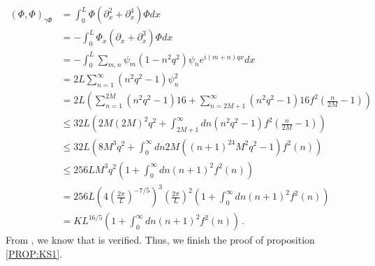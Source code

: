 \begin{align*}
  (\Phi, \Phi)_{\gamma \Phi} 
  & = \int_{0}^L \Phi(\partial^2_{x} + \partial^4_x) \Phi dx\\ 
  & = -\int_0^L \Phi_x(\partial_x + \partial^3_x) \Phi dx \\
  & = - \int_0^L \sum_{m, n} \psi_m (1 - n^2q^2) \psi_n e^{i(m+n)qx} dx \\
  & = 2L \sum_{n=1}^\infty(n^2q^2-1)\psi_n^2 \\
  & = 2L \left(\sum_{n=1}^{2M}(n^2q^2-1)16 +
    \sum_{n=2M+1}^\infty(n^2q^2-1)16f^2(\frac{n}{2M}-1)
    \right) \\
  & \le 32L \left( 2M (2M)^2 q^2 + 
    \int_{2M+1}^\infty dn (n^2q^2-1)f^2(\frac{n}{2M}-1)
    \right ) \\
  & \le 32L \left( 8M^3q^2 + 
    \int_{0}^\infty dn 2M((n+1)^24M^2q^2-1)f^2(n)
    \right) \\
  & \le 256LM^3q^2 \left(1 + 
    \int_{0}^\infty dn (n+1)^2f^2(n)
    \right) \\
  & =  256L\left(4(\frac{2\pi}{L})^{-7/5}\right)^3 \left(\frac{2\pi}{L}\right)^2
    \left(1 + 
    \int_{0}^\infty dn (n+1)^2f^2(n)
    \right) \\
  & =  KL^{16/5}\left(1 + 
    \int_{0}^\infty dn (n+1)^2f^2(n)
    \right) \,.
\end{align*}
From , we know that  is verified.
Thus, we finish the proof of proposition \ref{PROP:KS1}.


